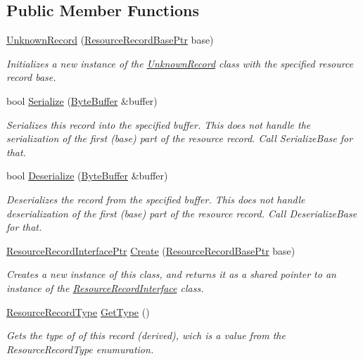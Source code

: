 \subsection*{Public Member Functions}
\begin{DoxyCompactItemize}
\item 
\hyperlink{class_senergy_1_1_dns_1_1_unknown_record_ac28afe26d98dc7729160d182c1aa25bd}{Unknown\-Record} (\hyperlink{namespace_senergy_1_1_dns_a72915c893fbf242018e79d8f92e1646b}{Resource\-Record\-Base\-Ptr} base)
\begin{DoxyCompactList}\small\item\em Initializes a new instance of the \hyperlink{class_senergy_1_1_dns_1_1_unknown_record}{Unknown\-Record} class with the specified resource record base. \end{DoxyCompactList}\item 
bool \hyperlink{class_senergy_1_1_dns_1_1_unknown_record_aa792712816e5f177b554f1b7d6018563}{Serialize} (\hyperlink{class_senergy_1_1_byte_buffer}{Byte\-Buffer} \&buffer)
\begin{DoxyCompactList}\small\item\em Serializes this record into the specified buffer. This does not handle the serialization of the first (base) part of the resource record. Call Serialize\-Base for that. \end{DoxyCompactList}\item 
bool \hyperlink{class_senergy_1_1_dns_1_1_unknown_record_af58fb86354cd176aefaa0000a706d646}{Deserialize} (\hyperlink{class_senergy_1_1_byte_buffer}{Byte\-Buffer} \&buffer)
\begin{DoxyCompactList}\small\item\em Deserializes the record from the specified buffer. This does not handle deserialization of the first (base) part of the resource record. Call Deserialize\-Base for that. \end{DoxyCompactList}\item 
\hyperlink{class_senergy_1_1_dns_1_1_resource_record_interface_abf5eec20c95f05b57c5c02eaed349e16}{Resource\-Record\-Interface\-Ptr} \hyperlink{class_senergy_1_1_dns_1_1_unknown_record_a98f66426e8e89449eaac24e0ac4eeb60}{Create} (\hyperlink{namespace_senergy_1_1_dns_a72915c893fbf242018e79d8f92e1646b}{Resource\-Record\-Base\-Ptr} base)
\begin{DoxyCompactList}\small\item\em Creates a new instance of this class, and returns it as a shared pointer to an instance of the \hyperlink{class_senergy_1_1_dns_1_1_resource_record_interface}{Resource\-Record\-Interface} class. \end{DoxyCompactList}\item 
\hyperlink{namespace_senergy_1_1_dns_a590bfd748c955364770f5ce358d9dfe0}{Resource\-Record\-Type} \hyperlink{class_senergy_1_1_dns_1_1_unknown_record_a3b6e5feb0277646b2513432cede8ebbd}{Get\-Type} ()
\begin{DoxyCompactList}\small\item\em Gets the type of of this record (derived), wich is a value from the Resource\-Record\-Type enumuration. \end{DoxyCompactList}\end{DoxyCompactItemize}
